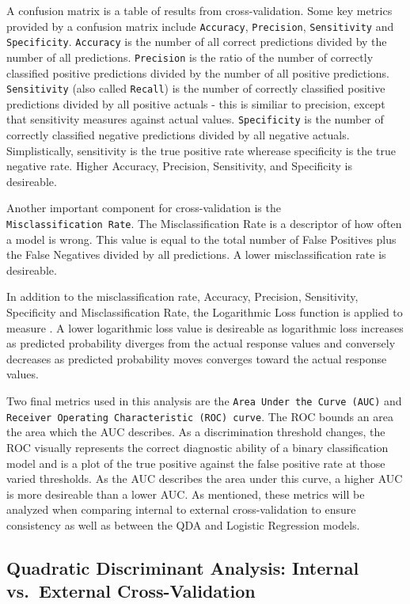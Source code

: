 \documentclass[american,]{article}
\begin{document}
A confusion matrix is a table of results from cross-validation. Some key metrics provided by a confusion matrix include \texttt{Accuracy}, \texttt{Precision}, \texttt{Sensitivity} and \texttt{Specificity}. \texttt{Accuracy} is the number of all correct predictions divided by the number of all predictions. \texttt{Precision} is the ratio of the number of correctly classified positive predictions divided by the number of all positive predictions. \texttt{Sensitivity} (also called \texttt{Recall}) is the number of correctly classified positive predictions divided by all positive actuals - this is similiar to precision, except that sensitivity measures against actual values. \texttt{Specificity} is the number of correctly classified negative predictions divided by all negative actuals. Simplistically, sensitivity is the true positive rate wherease specificity is the true negative rate. Higher Accuracy, Precision, Sensitivity, and Specificity is desireable.

Another important component for cross-validation is the \texttt{Misclassification\ Rate}. The Misclassification Rate is a descriptor of how often a model is wrong. This value is equal to the total number of False Positives plus the False Negatives divided by all predictions. A lower misclassification rate is desireable.

In addition to the misclassification rate, Accuracy, Precision, Sensitivity, Specificity and Misclassification Rate, the Logarithmic Loss function is applied to measure . A lower logarithmic loss value is desireable as logarithmic loss increases as predicted probability diverges from the actual response values and conversely decreases as predicted probability moves converges toward the actual response values.

Two final metrics used in this analysis are the \texttt{Area\ Under\ the\ Curve\ (AUC)} and \texttt{Receiver\ Operating\ Characteristic\ (ROC)\ curve}. The ROC bounds an area the area which the AUC describes. As a discrimination threshold changes, the ROC visually represents the correct diagnostic ability of a binary classification model and is a plot of the true positive against the false positive rate at those varied thresholds. As the AUC describes the area under this curve, a higher AUC is more desireable than a lower AUC. As mentioned, these metrics will be analyzed when comparing internal to external cross-validation to ensure consistency as well as between the QDA and Logistic Regression models.

\hypertarget{quadratic-discriminant-analysis-internal-vs.-external-cross-validation}{%
\subsection{\texorpdfstring{\textbf{Quadratic Discriminant Analysis: Internal vs.~External Cross-Validation}}{Quadratic Discriminant Analysis: Internal vs.~External Cross-Validation}}\label{quadratic-discriminant-analysis-internal-vs.-external-cross-validation}}
\end{document}
